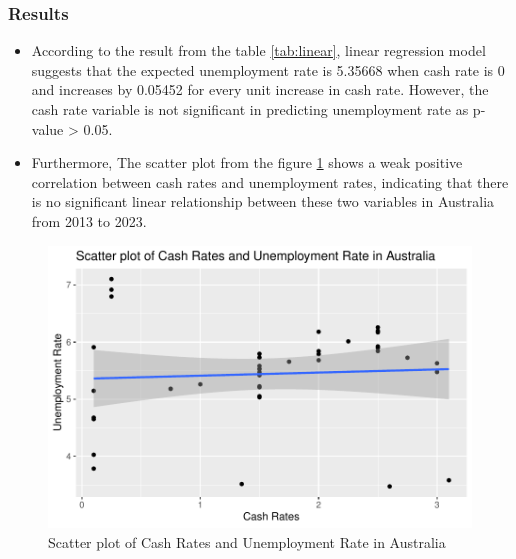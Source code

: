 \documentclass[11pt,a4paper,]{article}
\providecommand{\tightlist}{%
  \setlength{\itemsep}{0pt}\setlength{\parskip}{0pt}}
\begin{document}
\hypertarget{results-2}{%
\subsubsection{Results}\label{results-2}}

\begin{itemize}
\tightlist
\item
  According to the result from the table \ref{tab:linear}, linear regression model suggests that the expected unemployment rate is 5.35668 when cash rate is 0 and increases by 0.05452 for every unit increase in cash rate. However, the cash rate variable is not significant in predicting unemployment rate as p-value \textgreater{} 0.05.
\item
  Furthermore, The scatter plot from the figure \ref{fig:scatter} shows a weak positive correlation between cash rates and unemployment rates, indicating that there is no significant linear relationship between these two variables in Australia from 2013 to 2023.
\end{itemize}

\begin{figure}[H]

{\centering \includegraphics{Inflation_Analysis_files/figure-latex/scatter-1} 

}

\caption{Scatter plot of Cash Rates and Unemployment Rate in Australia}\label{fig:scatter}
\end{figure}
\end{document}
